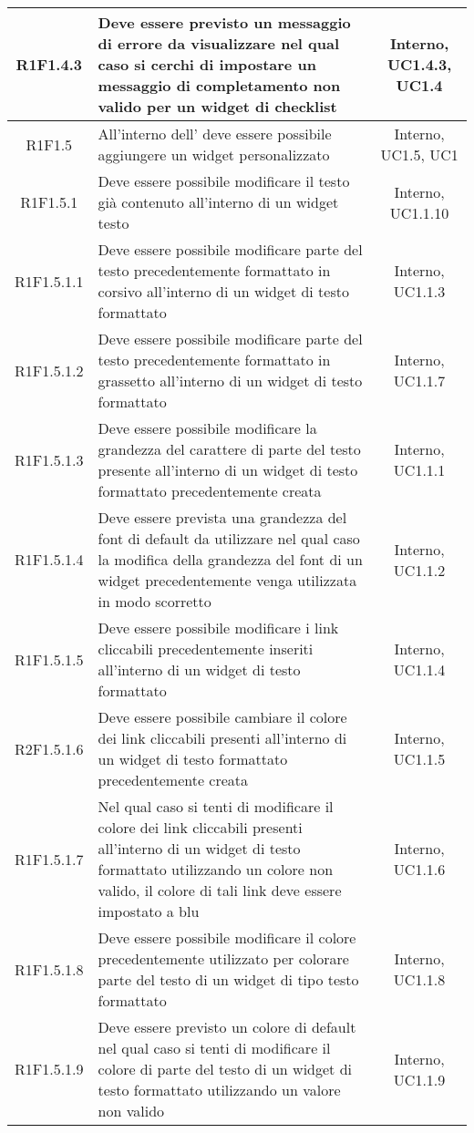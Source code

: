 \begin{longtable}{|c|>{\centering}m{7cm}|c|}
		\hline
		R1F1.4.3 & Deve essere previsto un messaggio di errore da visualizzare nel qual caso si cerchi di impostare un messaggio di completamento non valido per un widget di checklist & Interno, UC1.4.3, UC1.4 \\
		\hline	
		R1F1.5 & All'interno dell'\termine{SDK} deve essere possibile aggiungere un widget personalizzato & Interno, UC1.5, UC1 \\ 
			\hline
		R1F1.5.1 & Deve essere possibile modificare il testo già contenuto all'interno di un widget testo & Interno, UC1.1.10 \\
		\hline
		R1F1.5.1.1 & Deve essere possibile modificare parte del testo precedentemente formattato in corsivo all'interno di un widget di testo formattato & Interno, UC1.1.3 \\
		\hline
		R1F1.5.1.2 & Deve essere possibile modificare parte del testo precedentemente formattato in grassetto all'interno di un widget di testo formattato & Interno, UC1.1.7 \\
		\hline
		R1F1.5.1.3 & Deve essere possibile modificare la grandezza del carattere di parte del testo presente all'interno di un widget di testo formattato precedentemente creata & Interno, UC1.1.1\\
		\hline
		R1F1.5.1.4 & Deve essere prevista una grandezza del font di default da utilizzare nel qual caso la modifica della grandezza del font di un widget precedentemente venga utilizzata in modo scorretto & Interno, UC1.1.2 \\
		\hline
		R1F1.5.1.5 & Deve essere possibile modificare i link cliccabili precedentemente inseriti all'interno di un widget di testo formattato & Interno, UC1.1.4 \\
		\hline
		R2F1.5.1.6 & Deve essere possibile cambiare il colore dei link cliccabili presenti all'interno di un widget di testo formattato precedentemente creata & Interno, UC1.1.5 \\
		\hline
		R1F1.5.1.7 & Nel qual caso si tenti di modificare il colore dei link cliccabili presenti all'interno di un widget di testo formattato utilizzando un colore non valido, il colore di tali link deve essere impostato a blu & Interno, UC1.1.6 \\
		\hline
		R1F1.5.1.8 & Deve essere possibile modificare il colore precedentemente utilizzato per colorare parte del testo di un widget di tipo testo formattato & Interno, UC1.1.8 \\
		\hline
		R1F1.5.1.9 & Deve essere previsto un colore di default nel qual caso si tenti di modificare il colore di parte del testo di un widget di testo formattato utilizzando un valore non valido & Interno, UC1.1.9 \\

\end{longtable}

